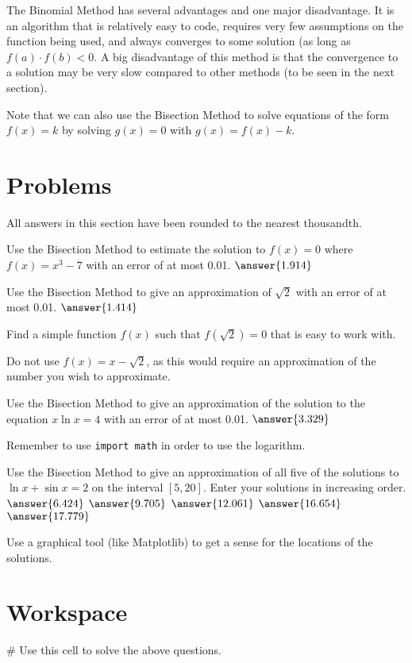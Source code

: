 \documentclass{ximera}
\begin{document}
The Binomial Method has several advantages and one major disadvantage. It is an algorithm that is relatively easy to code, requires very few assumptions on the function being used, and always converges to some solution (as long as $f(a)\cdot f(b) <0$. A big disadvantage of this method is that the convergence to a solution may be very slow compared to other methods (to be seen in the next section).

Note that we can also use the Bisection Method to solve equations of the form $f(x)=k$ by solving $g(x)=0$ with $g(x)=f(x)-k$.

\section{Problems}

All answers in this section have been rounded to the nearest thousandth.

\begin{question}
	Use the Bisection Method to estimate the solution to $f(x)=0$ where $f(x)=x^3-7$ with an error of at most 0.01. $\answer{1.914}$
\end{question}

\begin{question}
	Use the Bisection Method to give an approximation of $\sqrt{2}$ with an error of at most 0.01. $\answer{1.414}$
	\begin{hint}
		Find a simple function $f(x)$ such that $f(\sqrt{2})=0$ that is easy to work with.
	\end{hint}
	\begin{hint}
		Do not use $f(x)=x-\sqrt{2}$, as this would require an approximation of the number you wish to approximate.
	\end{hint}
\end{question}

\begin{question}
	Use the Bisection Method to give an approximation of the solution to the equation $x\ln{x}=4$ with an error of at most 0.01. $\answer{3.329}$
	\begin{hint}
		Remember to use \verb|import math| in order to use the logarithm.
	\end{hint}
\end{question}

\begin{question}
	Use the Bisection Method to give an approximation of all five of the solutions to $\ln{x}+\sin{x}=2$ on the interval $[5,20]$. Enter your solutions in increasing order. $\answer{6.424}$ $\answer{9.705}$ $\answer{12.061}$ $\answer{16.654}$ $\answer{17.779}$
	\begin{hint}
		Use a graphical tool (like Matplotlib) to get a sense for the locations of the solutions.
	\end{hint}
\end{question}

\section{Workspace}

\begin{sageCell}
# Use this cell to solve the above questions.
\end{sageCell}
\end{document}
